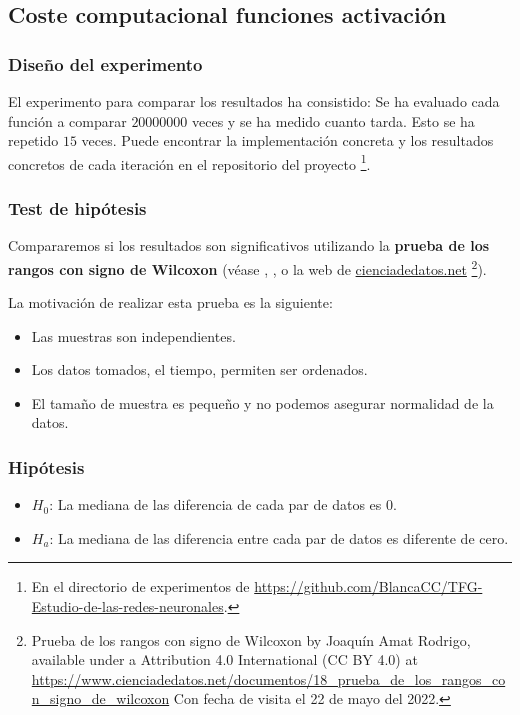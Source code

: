 \subsection{Coste computacional funciones activación }
\label{ch06:coste-computacional-funciones-activacion}

\subsubsection{Diseño del experimento}
El experimento para comparar los resultados ha consistido: 
Se ha evaluado cada función a comparar $20000000$ veces y se ha medido cuanto tarda. 
Esto se ha repetido $15$ veces. Puede encontrar la implementación concreta y los resultados concretos de cada iteración en el repositorio del
proyecto \footnote{En el directorio de experimentos 
de \url{https://github.com/BlancaCC/TFG-Estudio-de-las-redes-neuronales}.}.

\subsubsection{Test de hipótesis}

Compararemos si los resultados son significativos utilizando la \textbf{prueba de los rangos con 
signo de Wilcoxon} (véase \cite{OpenIntroStatistics}, \cite{BiologicalStatistics}, o la web de \href{https://www.cienciadedatos.net}{cienciadedatos.net} \footnote{
 Prueba de los rangos con signo de Wilcoxon by Joaquín Amat Rodrigo, available under a Attribution 4.0 International (CC BY 4.0) at
  \url{https://www.cienciadedatos.net/documentos/18_prueba_de_los_rangos_con_signo_de_wilcoxon}
  Con fecha de visita el 22 de mayo del 2022.
  }).

  La motivación de realizar esta prueba es la siguiente: 
\begin{itemize}
    \item Las muestras son independientes.
    \item Los datos tomados, el tiempo, permiten ser ordenados. 
    \item El tamaño de muestra es pequeño y no podemos asegurar normalidad de la datos. 
\end{itemize}

\subsubsection*{Hipótesis} 

\begin{itemize}
    \item $H_0$: La mediana de las diferencia de cada par de datos es $0$. 
    \item $H_a$: La mediana de las diferencia entre cada par de datos es diferente de cero. 
\end{itemize}

